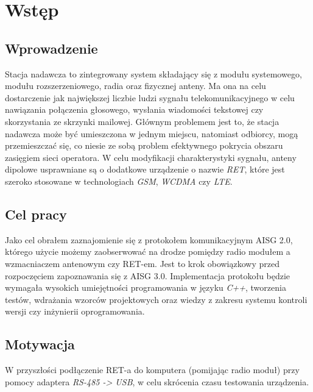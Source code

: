 \chapter{Wstęp}
\section{Wprowadzenie}
	Stacja nadawcza to zintegrowany system składający się z modułu systemowego, modułu rozszerzeniowego, radia oraz fizycznej anteny. 
	Ma ona na celu dostarczenie jak największej liczbie ludzi sygnału telekomunikacyjnego w celu nawiązania połączenia głosowego, 
	wysłania wiadomości tekstowej czy skorzystania ze skrzynki mailowej. Głównym problemem jest to, że stacja nadawcza może być umieszczona w jednym miejscu, 
	natomiast odbiorcy, mogą przemieszczać się, co niesie ze sobą problem efektywnego pokrycia obszaru zasięgiem sieci operatora.
	W celu modyfikacji charakterystyki sygnału, anteny dipolowe usprawniane są o dodatkowe urządzenie o nazwie \textit{RET}, które jest szeroko stosowane w technologiach 
	\textit{GSM}, \textit{WCDMA} czy \textit{LTE}.

\section{Cel pracy}
	Jako cel obrałem zaznajomienie się z protokołem komunikacyjnym AISG 2.0, którego użycie możemy zaobserwować na drodze pomiędzy 
	radio modułem a wzmacniaczem antenowym czy RET-em. 
	Jest to krok obowiązkowy przed rozpoczęciem zapoznawania się z AISG 3.0.
	Implementacja protokołu będzie wymagała wysokich umiejętności programowania w języku \textit{C++}, 
	tworzenia testów, wdrażania wzorców projektowych oraz wiedzy z zakresu systemu kontroli wersji czy inżynierii oprogramowania.

\section{Motywacja}
	W przyszłości podłączenie RET-a do komputera (pomijając radio moduł) przy pomocy adaptera \textit{RS-485 -> USB}, w celu skrócenia czasu testowania urządzenia.

